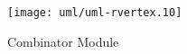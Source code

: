 \begin{figure}[htp]
  \begin{center}
    \texttt{[image: uml/uml-rvertex.10]}
    \caption{Combinator Module}
    \label{fig:sim-modules-helpers-combinator}
  \end{center}
\end{figure}